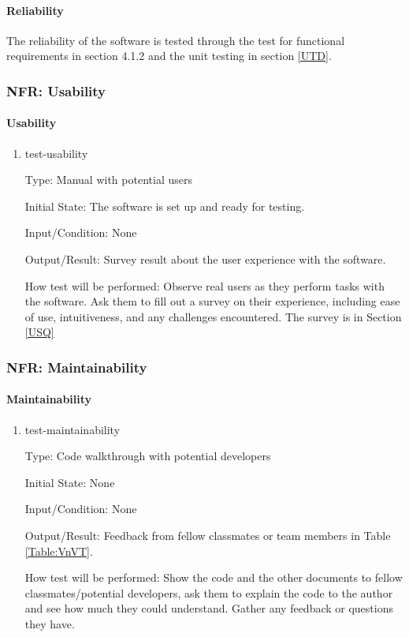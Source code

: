 \documentclass[12pt, titlepage]{article}
\begin{document}
\paragraph{Reliability}

The reliability of the software is tested through the test for functional requirements in section 4.1.2 and the unit testing in section \ref{UTD}.					

\subsubsection{NFR: Usability}\label{t_usability}
		
\paragraph{Usability}

\begin{enumerate}

\item{test-usability}

Type: Manual with potential users
					
Initial State: The software is set up and ready for testing.
					
Input/Condition: None
					
Output/Result: Survey result about the user experience with the software.
					
How test will be performed: Observe real users as they perform tasks with the software. Ask them to fill out a survey on their experience, including ease of use, intuitiveness, and any challenges encountered. The survey is in Section \ref{USQ}
\end{enumerate}

		
\subsubsection{NFR: Maintainability}\label{t_maintainability}
		
\paragraph{Maintainability}

\begin{enumerate}

\item{test-maintainability}

Type: Code walkthrough with potential developers
					
Initial State: None
					
Input/Condition: None
					
Output/Result: Feedback from fellow classmates or team members in Table \ref{Table:VnVT}.				
	
How test will be performed: Show the code and the other documents to fellow classmates/potential developers, ask them to explain the code to the author and see how much they could understand. Gather any feedback or questions they have.
\end{enumerate}
\end{document}

